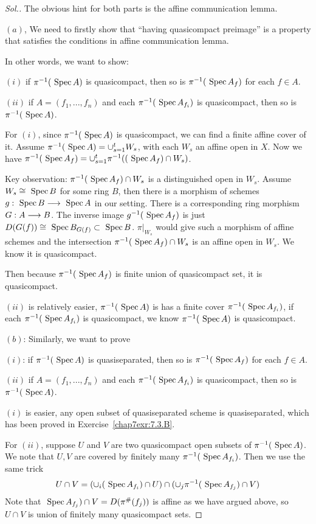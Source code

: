 \documentclass[11pt]{book} %
\begin{document}
\begin{proof}[Sol.]
The obvious hint for both parts is the affine communication lemma.

$(a)$, We need to firstly show that ``having quasicompact preimage'' is  a property that satisfies the conditions in affine communication lemma.

In other words, we want to show:

$(i)$ if $\pi^{-1}(\text{ Spec\,} A)$ is quasicompact, then so is $\pi^{-1}(\text{ Spec\,} A_f)$ for each $f\in A$.

$(ii)$ if $A=(f_1,...,f_n)$ and each $\pi^{-1}(\text{ Spec\,} A_{f_i})$ is quasicompact, then so is $\pi^{-1}(\text{ Spec\,} A)$.

For $(i)$, since $\pi^{-1}(\text{ Spec\,} A)$ is quasicompact, we can find a finite affine cover of it. Assume $\pi^{-1}(\text{ Spec\,} A)=\cup^t_{s=1} W_s$, with each $W_s$ an affine open in $X$. Now we have $\pi^{-1}(\text{ Spec\,} A_f)=\cup_{s=1}^t\pi^{-1}((\text{ Spec\,} A_f)\cap W_s)$.

Key observation: $\pi^{-1}(\text{ Spec\,} A_f)\cap W_s$ is a distinguished open in $W_s$. Assume $W_s\cong \text{ Spec\,} B$ for some ring $B$, then there is a morphism of schemes $g:\text{ Spec\,} B\longrightarrow \text{ Spec\,} A$ in our setting. There is a corresponding ring morphism $G:A\longrightarrow B$. The inverse image $g^{-1}(\text{ Spec\,} A_f)$ is just $D(G(f))\cong \text{ Spec\,} B_{G(f)}\subset \text{ Spec\,} B$. $\pi|_{W_s}$ would give such a morphism of affine schemes and the intersection $\pi^{-1}(\text{ Spec\,} A_f)\cap W_s$ is an affine open in $W_s$. We know it is quasicompact.

Then because $\pi^{-1}(\text{ Spec\,} A_f)$ is finite union of quasicompact set, it is quasicompact.

$(ii)$ is relatively easier, $\pi^{-1}(\text{ Spec\,} A)$ is has a finite cover $\pi^{-1}(\text{ Spec\,} A_{f_i})$, if each $\pi^{-1}(\text{ Spec\,} A_{f_i})$ is quasicompact, we know $\pi^{-1}(\text{ Spec\,} A)$ is quasicompact.

$(b)$: Similarly, we want to prove

$(i)$: if $\pi^{-1}(\text{ Spec\,} A)$ is quasiseparated, then so is $\pi^{-1}(\text{ Spec\,} A_f)$ for each $f\in A$.

$(ii)$ if $A=(f_1,...,f_n)$ and each $\pi^{-1}(\text{ Spec\,} A_{f_i})$ is quasicompact, then so is $\pi^{-1}(\text{ Spec\,} A)$.

$(i)$ is easier, any open subset of quasiseparated scheme is quasiseparated, which has been proved in Exercise~\ref{chap7exr:7.3.B}.

For $(ii)$, suppose $U$ and $V$ are two quasicompact open subsets of $\pi^{-1}(\text{ Spec\,} A)$. We note that $U,V$ are covered by finitely many $\pi^{-1}(\text{ Spec\,} A_{f_i})$.
Then we use the same trick
$$
U\cap V=(\cup_{i}(\text{ Spec\,} A_{f_i})\cap U)\cap (\cup_{j}\pi^{-1}(\text{ Spec\,} A_{f_j})\cap V)
$$
Note that $\text{ Spec\,} A_{f_j})\cap V=D(\pi^\#(f_j))$ is affine as we have argued above, so $U\cap V$ is union of finitely many quasicompact sets.
\end{proof}
\end{document}
